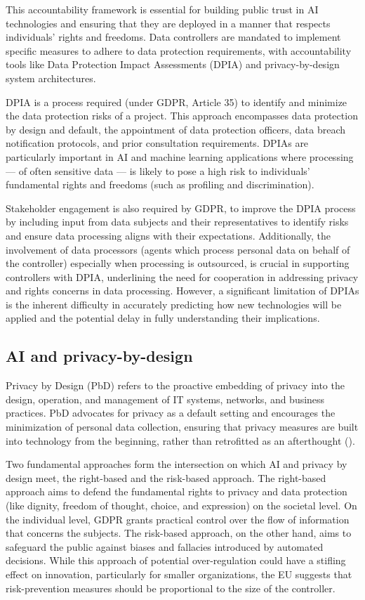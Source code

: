 \documentclass{article}
\begin{document}
This accountability framework is essential for building public trust in AI technologies and ensuring that they are deployed in a manner that respects individuals' rights and freedoms. Data controllers are mandated to implement specific measures to adhere to data protection requirements, with accountability tools like Data Protection Impact Assessments (DPIA) and privacy-by-design system architectures.

DPIA is a process required (under GDPR, Article 35) to identify and minimize the data protection risks of a project. This approach encompasses data protection by design and default, the appointment of data protection officers, data breach notification protocols, and prior consultation requirements. DPIAs are particularly important in AI and machine learning applications where processing — of often sensitive data — is likely to pose a high risk to individuals' fundamental rights and freedoms (such as profiling and discrimination).

Stakeholder engagement is also required by GDPR, to improve the DPIA process by including input from data subjects and their representatives to identify risks and ensure data processing aligns with their expectations. Additionally, the involvement of data processors (agents which process personal data on behalf of the controller) especially when processing is outsourced, is crucial in supporting controllers with DPIA, underlining the need for cooperation in addressing privacy and rights concerns in data processing.
However, a significant limitation of DPIAs is the inherent difficulty in accurately predicting how new technologies will be applied and the potential delay in fully understanding their implications.


\subsection{AI and privacy-by-design}
\label{ssec:privacy_by_design}

Privacy by Design (PbD) refers to the proactive embedding of privacy into the design, operation, and management of IT systems, networks, and business practices. PbD advocates for privacy as a default setting and encourages the minimization of personal data collection, ensuring that privacy measures are built into technology from the beginning, rather than retrofitted as an afterthought (\cite{Schaar2010}).

Two fundamental approaches form the intersection on which AI and privacy by design meet, the right-based and the risk-based approach. The right-based approach aims to defend the fundamental rights to privacy and data protection (like dignity, freedom of thought, choice, and expression) on the societal level. On the individual level, GDPR grants practical control over the flow of information that concerns the subjects. The risk-based approach, on the other hand, aims to safeguard the public against biases and fallacies introduced by automated decisions. While this approach of potential over-regulation could have a stifling effect on innovation, particularly for smaller organizations, the EU suggests that risk-prevention measures should be proportional to the size of the controller.
\end{document}
